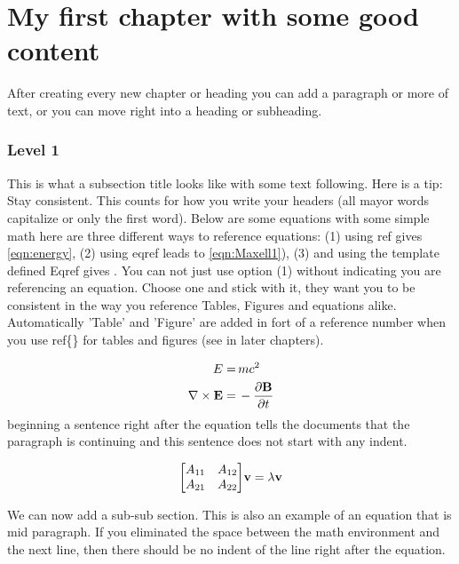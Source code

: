 \chapter{My first chapter with some good content\label{chapTwo}}

After creating every new chapter or heading you can add a paragraph or more of text, or you can move right into a heading or subheading.

\subsection{Level 1}\label{sec:firstSection}
This is what a subsection title looks like with some text following. Here is a tip: Stay consistent. This counts for how you write your headers (all mayor words capitalize or only the first word). 
Below are some equations with some simple math here are three different ways to reference equations: (1) using ref  gives \ref{eqn:energy}, (2) using eqref leads to \eqref{eqn:Maxell1}), (3) and using the template defined Eqref gives . You can not just use option (1) without indicating you are referencing an equation. Choose one and stick with it, they want you to be consistent in the way you reference Tables, Figures and equations alike. Automatically 'Table' and 'Figure' are added in fort of a reference number when you use ref\{\} for tables and figures (see in later chapters).

\begin{align}
    E =&\, m c^2 \label{eqn:energy}\\
    \nabla \times \bE =&\, -\frac{\partial {\bf B}}{\partial t} \label{eqn:Maxell1}
\end{align}
beginning a sentence right after the equation tells the documents that the paragraph is continuing and this sentence does not start with any indent. 

\begin{align}
	{\left[\begin{matrix}
	A_{11} & A_{12}\\ 
	A_{21} & A_{22}
	\end{matrix}\right]} {\bf v}=\lambda {\bf v}
	\label{eqn:Evalue}
\end{align}

We can now add a sub-sub section. This is also an example of an equation that is mid paragraph. If you eliminated the space between the math environment and the next line, then there should be no indent of the line right after the equation.

